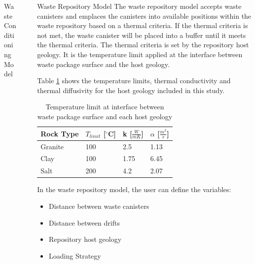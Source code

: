 \documentclass[final]{beamer}
\newlength{\sepwid}
\newlength{\onecolwid}
\newlength{\threecolwid}
\begin{document}
\begin{frame}[t]
\begin{columns}[t,totalwidth=\threecolwid]
\begin{column}{\onecolwid}
\begin{block}{Waste Conditioning Model}
	\end{block}


\end{column} %

\begin{column}{\sepwid}\end{column} %



\begin{column}{\onecolwid} %

\begin{block}{Waste Repository Model}
The waste repository model accepts waste canisters and emplaces the canisters into 
available positions within the waste repository based on a thermal criteria. 
If the thermal criteria is not met, the waste canister will be placed into a buffer 
until it meets the thermal criteria.  
The thermal criteria is set by the repository host geology. 
It is the temperature limit applied at the interface between waste package surface 
and the host geology. 

Table \ref{tab:temp_limit} shows the temperature limits, thermal conductivity 
and thermal diffusivity for the host geology included in this study. 

\begin{table}[]
	\label{tab:temp_limit}
	\caption{Temperature limit at interface between waste package surface 
	and each host geology \cite{sutton_investigations_2011}}
	\begin{tabular}{|l|l|l|l|}
	\hline
	Rock Type & $T_{limit}$ [$^\circ$C] & k [$\frac{W}{mK}$] &  $\alpha$ [$\frac{m^2}{s}$]  \\ \hline
	Granite   & 100 & 2.5  & 1.13\\ \hline
	Clay      & 100 & 1.75 & 6.45\\ \hline
	Salt      & 200 & 4.2  & 2.07\\ \hline
	\end{tabular}
\end{table}

In the waste repository model, the user can define the variables: 
	\begin{itemize}
		\item Distance between waste canisters
		\item Distance between drifts 
		\item Repository host geology 
		\item Loading Strategy 
	\end{itemize}


\end{block}
\end{column}
\end{columns}
\end{frame}
\end{document}

